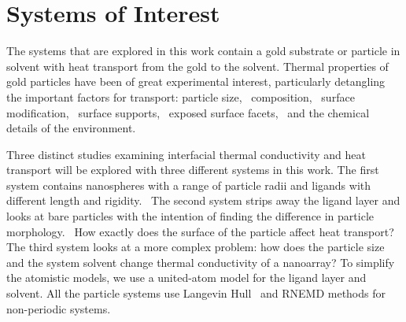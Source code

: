 \section{Systems of Interest}
The systems that are explored in this work contain a gold substrate or particle in solvent with heat transport from the gold to the solvent. 
Thermal properties of gold particles have been of great experimental interest, particularly detangling the important factors for transport: particle size,~\cite{Zanjani2014,Liu2015,Wilhelmsen2015,Stocker2016,Tascini2016} composition,~\cite{Wilson:2002uq, Ong:2013rt} surface modification,~\cite{kuang:AuThl,Ong:2013rt,Ong:2014yq,Liu2015,Stocker2016,Hannah2015,Park2016,Leitner2017} surface supports,~\cite{Park2012} exposed surface facets,~\cite{Hannah2015} and the chemical details of the environment.~\cite{Ge2006,Park2012,Ong:2013rt,Ong:2014yq,Wilhelmsen2015,Park2016} 

Three distinct studies examining interfacial thermal conductivity and heat transport will be explored with three different systems in this work.
The first system contains nanospheres with a range of particle radii and ligands with different length and rigidity.~\cite{Stocker2016}
The second system strips away the ligand layer and looks at bare particles with the intention of finding the difference in particle morphology.~\cite{Neidhart}
How exactly does the surface of the particle affect heat transport?
The third system looks at a more complex problem: how does the particle size and the system solvent change thermal conductivity of a nanoarray?
To simplify the atomistic models, we use a united-atom model for the ligand layer and solvent.
All the particle systems use Langevin Hull~\cite{Vardeman2011} and RNEMD methods for non-periodic systems.~\cite{Stocker:2014qq}
